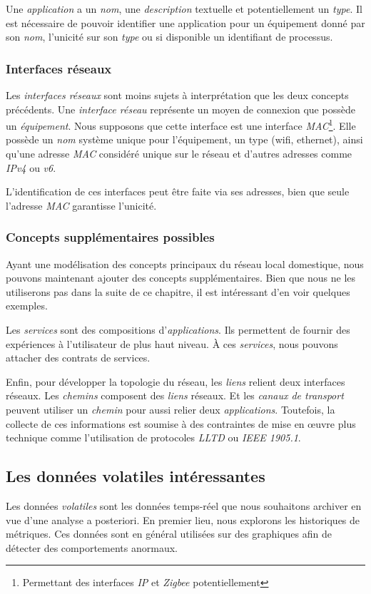 Une \textit{application} a un \textit{nom}, une \textit{description} textuelle et potentiellement un \textit{type}. Il est nécessaire de pouvoir identifier une application pour un équipement donné par son \textit{nom}, l'unicité sur son \textit{type} ou si disponible un identifiant de processus.

\subsubsection{Interfaces réseaux}
Les \textit{interfaces réseaux} sont moins sujets à interprétation que les deux concepts précédents. Une \textit{interface réseau} représente un moyen de connexion que possède un \textit{équipement}. Nous supposons que cette interface est une interface \textit{MAC}\footnote{Permettant des interfaces \textit{IP} et \textit{Zigbee} potentiellement}. Elle possède un \textit{nom} système unique pour l'équipement, un type (wifi, ethernet), ainsi qu'une adresse \textit{MAC} considéré unique sur le réseau et d'autres adresses comme \textit{IPv4} ou \textit{v6}.

L'identification de ces interfaces peut être faite via ses adresses, bien que seule l'adresse \textit{MAC} garantisse l'unicité.

\subsubsection{Concepts supplémentaires possibles}
Ayant une modélisation des concepts principaux du réseau local domestique, nous pouvons maintenant ajouter des concepts supplémentaires. Bien que nous ne les utiliserons pas dans la suite de ce chapitre, il est intéressant d'en voir quelques exemples.

Les \textit{services} sont des compositions d'\textit{applications}. Ils permettent de fournir des expériences à l'utilisateur de plus haut niveau. À ces \textit{services}, nous pouvons attacher des contrats de services.

Enfin, pour développer la topologie du réseau, les \textit{liens} relient deux interfaces réseaux. Les \textit{chemins} composent des \textit{liens} réseaux. Et les \textit{canaux de transport} peuvent utiliser un \textit{chemin} pour aussi relier deux \textit{applications}. Toutefois, la collecte de ces informations est soumise à des contraintes de mise en œuvre plus technique comme l'utilisation de protocoles \textit{LLTD} ou \textit{IEEE 1905.1}.

\subsection{Les données volatiles intéressantes}
Les données \textit{volatiles} sont les données temps-réel que nous souhaitons archiver en vue d'une analyse a posteriori. En premier lieu, nous explorons les historiques de métriques. Ces données sont en général utilisées sur des graphiques afin de détecter des comportements anormaux.

